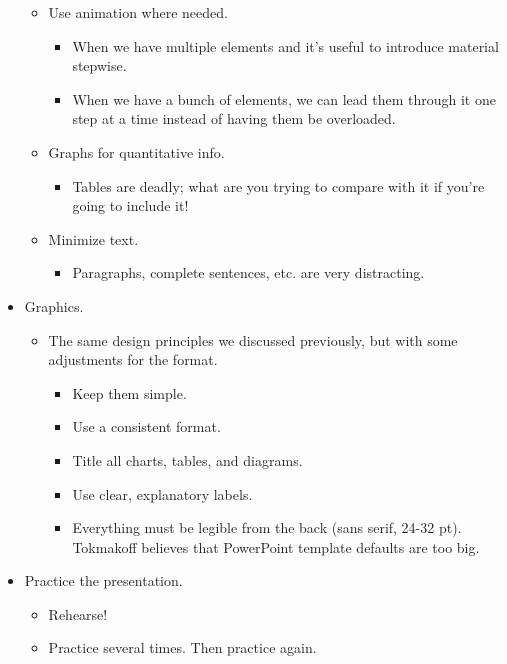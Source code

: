 \documentclass[../notes.tex]{subfiles}
\begin{document}
\begin{itemize}
\begin{itemize}
\begin{itemize}
        \end{itemize}
        \item Use animation where needed.
        \begin{itemize}
            \item When we have multiple elements and it's useful to introduce material stepwise.
            \item When we have a bunch of elements, we can lead them through it one step at a time instead of having them be overloaded.
        \end{itemize}
        \item Graphs for quantitative info.
        \begin{itemize}
            \item Tables are deadly; what are you trying to compare with it if you're going to include it!
        \end{itemize}
        \item Minimize text.
        \begin{itemize}
            \item Paragraphs, complete sentences, etc. are very distracting.
        \end{itemize}
    \end{itemize}
    \item Graphics.
    \begin{itemize}
        \item The same design principles we discussed previously, but with some adjustments for the format.
        \begin{itemize}
            \item Keep them simple.
            \item Use a consistent format.
            \item Title all charts, tables, and diagrams.
            \item Use clear, explanatory labels.
            \item Everything must be legible from the back (sans serif, 24-32 pt). Tokmakoff believes that PowerPoint template defaults are too big.
        \end{itemize}
    \end{itemize}
    \item Practice the presentation.
    \begin{itemize}
        \item Rehearse!
        \item Practice several times. Then practice again.
        \begin{itemize}

\end{itemize}
\end{itemize}
\end{itemize}
\end{document}

